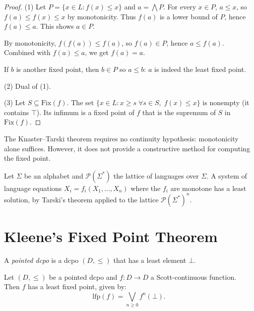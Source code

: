 \begin{proof}
(1) Let $P = \{x \in L : f(x) \leq x\}$ and $a = \bigwedge P$. For every $x \in P$,
$a \leq x$, so $f(a) \leq f(x) \leq x$ by monotonicity. Thus $f(a)$ is a lower bound
of $P$, hence $f(a) \leq a$. This shows $a \in P$.

By monotonicity, $f(f(a)) \leq f(a)$, so $f(a) \in P$, hence $a \leq f(a)$. Combined
with $f(a) \leq a$, we get $f(a) = a$.

If $b$ is another fixed point, then $b \in P$ so $a \leq b$: $a$ is indeed the least
fixed point.

(2) Dual of (1).

(3) Let $S \subseteq \mathrm{Fix}(f)$. The set
$\{x \in L : x \geq s \; \forall s \in S, \; f(x) \leq x\}$ is nonempty (it contains
$\top$). Its infimum is a fixed point of $f$ that is the supremum of $S$ in
$\mathrm{Fix}(f)$.
\end{proof}

\begin{remark}
The Knaster--Tarski theorem requires no continuity hypothesis: monotonicity alone suffices.
However, it does not provide a constructive method for computing the fixed point.
\end{remark}

\begin{example}
Let $\Sigma$ be an alphabet and $\mathcal{P}(\Sigma^*)$ the lattice of languages over
$\Sigma$. A system of language equations $X_i = f_i(X_1, \ldots, X_n)$ where the $f_i$
are monotone has a least solution, by Tarski's theorem applied to the lattice
$\mathcal{P}(\Sigma^*)^n$.
\end{example}

\section{Kleene's Fixed Point Theorem}

\begin{definition}
A \emph{pointed dcpo} is a dcpo $(D, \leq)$ that has a least element $\bot$.
\end{definition}

\begin{theorem}[Kleene]
\label{thm:kleene}
Let $(D, \leq)$ be a pointed dcpo and $f\colon D \to D$ a Scott-continuous function. Then
$f$ has a least fixed point, given by:
\[
  \mathrm{lfp}(f) = \bigvee_{n \geq 0} f^n(\bot).
\]
\end{theorem}

